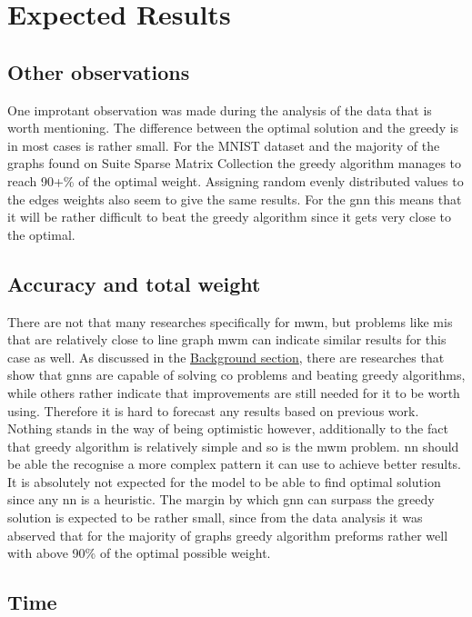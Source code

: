 \section{Expected Results}

\subsection{Other observations}

One improtant observation was made during the analysis of the data that is worth mentioning. The difference between the optimal solution and the greedy is in most cases is rather small. For the MNIST dataset and the majority of the graphs found on Suite Sparse Matrix Collection the greedy algorithm manages to reach 90+\% of the optimal weight. Assigning random evenly distributed values to the edges weights also seem to give the same results. For the \gls{gnn} this means that it will be rather difficult to beat the greedy algorithm since it gets very close to the optimal.

\subsection{Accuracy and total weight}

There are not that many researches specifically for \gls{mwm}, but problems like \gls{mis} that are relatively close to line graph \gls{mwm} can indicate similar results for this case as well. As discussed in the \hyperref[sec:background]{Background section}, there are researches that show that \gls{gnn}s are capable of solving \gls{co} problems and beating greedy algorithms, while others rather indicate that improvements are still needed for it to be worth using. Therefore it is hard to forecast any results based on previous work. Nothing stands in the way of being optimistic however, additionally to the fact that greedy algorithm is relatively simple and so is the \gls{mwm} problem. \gls{nn} should be able the recognise a more complex pattern it can use to achieve better results. It is absolutely not expected for the model to be able to find optimal solution since any \gls{nn} is a heuristic. The margin by which \gls{gnn} can surpass the greedy solution is expected to be rather small, since from the data analysis it was abserved that for the majority of graphs greedy algorithm preforms rather well with above 90\% of the optimal possible weight.

\subsection{Time}

